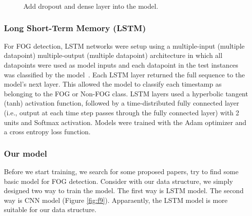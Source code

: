 \documentclass[10pt,twocolumn,letterpaper]{article}
\begin{document}
\begin{figure}[t]
    \centering
    \caption{Add dropout and dense layer into the model.}
    \label{fig:f11}
\end{figure}

\subsubsection{Long Short-Term Memory (LSTM)}
\label{sec:lstm}

    For FOG detection, LSTM networks were setup using a multiple-input (multiple datapoint) multiple-output (multiple datapoint) architecture in which all datapoints were used as model inputs and each datapoint in the test instances was classified by the model~\cite{Shalin2021}. Each LSTM layer returned the full sequence to the model’s next layer. This allowed the model to classify each timestamp as belonging to the FOG or Non-FOG class. LSTM layers used a hyperbolic tangent (tanh) activation function, followed by a time-distributed fully connected layer (i.e., output at each time step passes through the fully connected layer) with 2 units and Softmax activation. Models were trained with the Adam optimizer and a cross entropy loss function.

\subsubsection{Our model}
\label{sec:our_model}

    Before we start training, we search for some proposed papers, try to find some basic model for FOG detection. Consider with our data structure, we simply designed two way to train the model. The first way is LSTM model. The second way is CNN model (Figure \ref{fig:f9}). Apparaently, the LSTM model is more suitable for our data structure.
\end{document}
